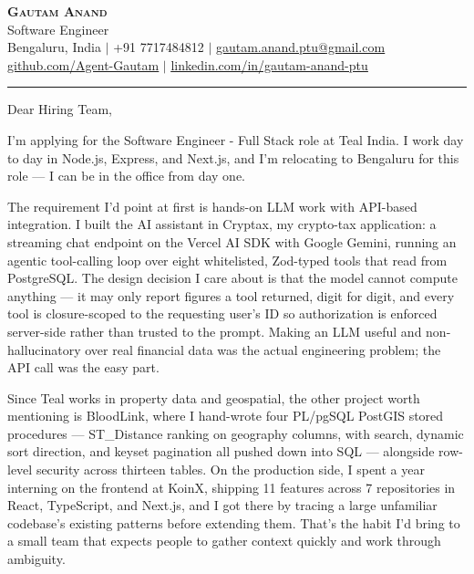 \documentclass[letterpaper,11pt]{article}
\begin{document}
\begin{center}
    \textbf{\Huge \scshape Gautam Anand} \\ \vspace{2pt}
    \small Software Engineer \\ \vspace{2pt}
    \small Bengaluru, India $|$ +91 7717484812 $|$
    \href{mailto:gautam.anand.ptu@gmail.com}{\underline{gautam.anand.ptu@gmail.com}} \\ \vspace{1pt}
    \small \href{https://github.com/Agent-Gautam}{\underline{github.com/Agent-Gautam}} $|$
    \href{https://www.linkedin.com/in/gautam-anand-ptu}{\underline{linkedin.com/in/gautam-anand-ptu}}
\end{center}

\vspace{6pt}
\hrule
\vspace{10pt}

Dear Hiring Team,

I'm applying for the Software Engineer - Full Stack role at Teal India. I work day to day in Node.js, Express, and Next.js, and I'm relocating to Bengaluru for this role --- I can be in the office from day one.

The requirement I'd point at first is hands-on LLM work with API-based integration. I built the AI assistant in Cryptax, my crypto-tax application: a streaming chat endpoint on the Vercel AI SDK with Google Gemini, running an agentic tool-calling loop over eight whitelisted, Zod-typed tools that read from PostgreSQL. The design decision I care about is that the model cannot compute anything --- it may only report figures a tool returned, digit for digit, and every tool is closure-scoped to the requesting user's ID so authorization is enforced server-side rather than trusted to the prompt. Making an LLM useful and non-hallucinatory over real financial data was the actual engineering problem; the API call was the easy part.

Since Teal works in property data and geospatial, the other project worth mentioning is BloodLink, where I hand-wrote four PL/pgSQL PostGIS stored procedures --- ST\_Distance ranking on geography columns, with search, dynamic sort direction, and keyset pagination all pushed down into SQL --- alongside row-level security across thirteen tables. On the production side, I spent a year interning on the frontend at KoinX, shipping 11 features across 7 repositories in React, TypeScript, and Next.js, and I got there by tracing a large unfamiliar codebase's existing patterns before extending them. That's the habit I'd bring to a small team that expects people to gather context quickly and work through ambiguity.
\end{document}
